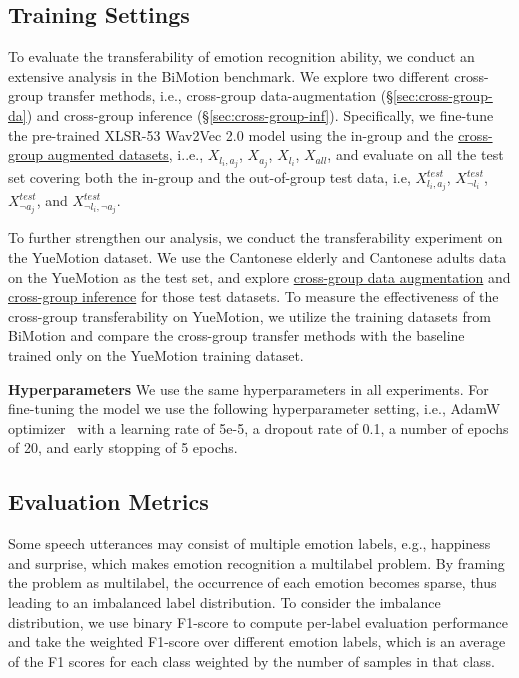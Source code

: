 \documentclass{INTERSPEECH2023}
\newcommand{\ulcolor}[2][]{\setulcolor{#1}\ul{#2}}
\begin{document}
\subsection{Training Settings}

To evaluate the transferability of emotion recognition ability, we conduct an extensive analysis in the BiMotion benchmark. We explore two different cross-group transfer methods, i.e., cross-group data-augmentation (\S\ref{sec:cross-group-da}) and cross-group inference (\S\ref{sec:cross-group-inf}). Specifically, we fine-tune the pre-trained XLSR-53 Wav2Vec 2.0 model using the in-group and the \ulcolor[darkgreen]{cross-group augmented datasets}, i..e., $X_{l_i, a_j}$, $X_{a_j}$, $X_{l_i}$, $X_{all}$, and evaluate on all the test set covering both the in-group and the out-of-group test data, i.e, $X^{test}_{l_i, a_j}$, $X^{test}_{\neg l_i}$, $X^{test}_{\neg a_j}$,  and $X^{test}_{\neg l_i, \neg a_j}$. 

To further strengthen our analysis, we conduct the transferability experiment on the YueMotion dataset. We use the Cantonese elderly and Cantonese adults data on the YueMotion as the test set, and explore \ulcolor[darkgreen]{cross-group data augmentation} and \ulcolor[orange]{cross-group inference} for those test datasets. To measure the effectiveness of the cross-group transferability on YueMotion, we utilize the training datasets from BiMotion and compare the cross-group transfer methods with the baseline trained only on the YueMotion training dataset.

\textbf{Hyperparameters} We use the same hyperparameters in all experiments. For fine-tuning the model we use the following hyperparameter setting, i.e., AdamW optimizer~\cite{loshchilov2018decoupled} with a learning rate of 5e-5, a dropout rate of 0.1, a number of epochs of 20, and early stopping of 5 epochs.

\subsection{Evaluation Metrics}

Some speech utterances may consist of multiple emotion labels, e.g., happiness and surprise, which makes emotion recognition a multilabel problem. By framing the problem as multilabel, the occurrence of each emotion becomes sparse, thus leading to an imbalanced label distribution. To consider the imbalance distribution, we use binary F1-score to compute per-label evaluation performance and take the weighted F1-score over different emotion labels, which is an average of the F1 scores for each class weighted by the number of samples in that class. 
\end{document}
